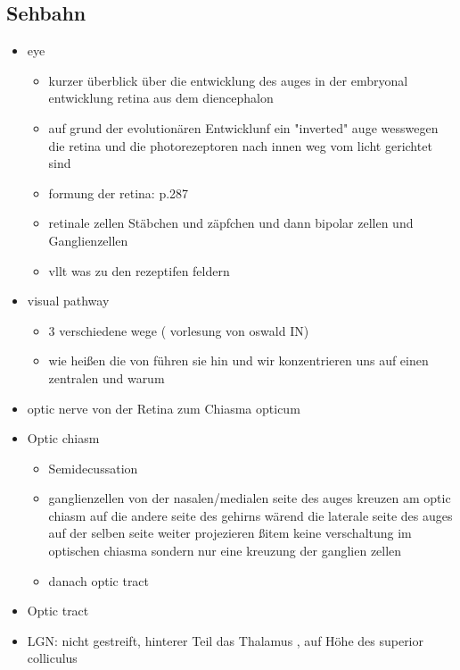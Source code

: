 \documentclass[12pt,a4paper,pdftex]{article}
\begin{document}
\subsection{Sehbahn}
\begin{itemize}
    \item eye
    \begin{itemize}
        \item kurzer überblick über die entwicklung des auges in der embryonal entwicklung retina aus dem diencephalon
        \item auf grund der evolutionären Entwicklunf ein "inverted" auge wesswegen die retina und die photorezeptoren nach innen weg vom licht gerichtet sind
        \item formung der retina: \cite{smith2008biology} p.287
        \item retinale zellen Stäbchen und zäpfchen und dann bipolar zellen und Ganglienzellen 
        \item vllt was zu den rezeptifen feldern
    \end{itemize}
    \item visual pathway
    \begin{itemize}
        \item 3 verschiedene wege ( vorlesung von oswald IN)
        \item wie heißen die von führen sie hin und wir konzentrieren uns auf einen zentralen und warum
    \end{itemize}
    \item optic nerve von der Retina zum Chiasma opticum
    \item Optic chiasm    
    \begin{itemize}
        \item Semidecussation  
        \item ganglienzellen von der nasalen/medialen seite des auges kreuzen am optic chiasm auf die andere seite des gehirns wärend die laterale seite des auges auf der selben seite weiter projezieren
        ßitem keine verschaltung im optischen chiasma sondern nur eine kreuzung der ganglien zellen
        \item danach optic tract
    \end{itemize}
    \item Optic tract 
    \item LGN: nicht gestreift, hinterer Teil das Thalamus , auf Höhe des superior colliculus 

\end{itemize}
\end{document}
